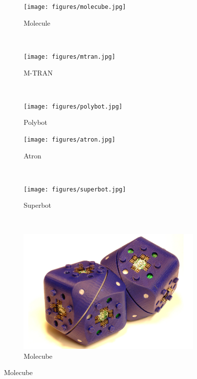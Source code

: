 \begin{figure}[!p]
    \centering
    \begin{subfigure}[b]{0.315\textwidth}
        \centering
        \texttt{[image: figures/molecube.jpg]}
        \caption{Molecule}
    \end{subfigure}
    ~
    \begin{subfigure}[b]{0.315\textwidth}
        \centering
        \texttt{[image: figures/mtran.jpg]}
        \caption{M-TRAN}
    \end{subfigure}
    ~
    \begin{subfigure}[b]{0.315\textwidth}
        \centering
        \texttt{[image: figures/polybot.jpg]}
        \caption{Polybot}
    \end{subfigure}

    \begin{subfigure}[b]{0.315\textwidth}
        \centering
        \texttt{[image: figures/atron.jpg]}
        \caption{Atron}
    \end{subfigure}
    ~
    \begin{subfigure}[b]{0.315\textwidth}
        \centering
        \texttt{[image: figures/superbot.jpg]}
        \caption{Superbot}
    \end{subfigure}
    ~
    \begin{subfigure}[b]{0.315\textwidth}
        \centering
        \includegraphics[width=\textwidth,height=\textwidth,keepaspectratio]{figures/molecube.png}
        \caption{Molecube}
    \end{subfigure}


\end{figure}
